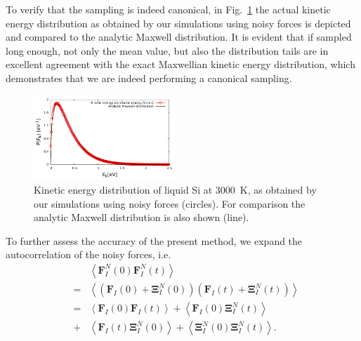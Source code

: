 \documentclass[format=acmsmall,authorversion,nonacm,timestamp,urlbreakonhyphens]{acmart}
\begin{document}
To verify that the sampling is indeed canonical, in Fig.~\ref{Fig3} the actual kinetic energy distribution as obtained by our simulations using noisy forces is depicted and compared to the analytic Maxwell distribution. It is evident that if sampled long enough, not only the mean value, but also the distribution tails are in excellent agreement with the exact Maxwellian kinetic energy distribution, which demonstrates that we are indeed performing a canonical sampling.
\begin{figure}
\begin{center}
\includegraphics[width=0.475\textwidth]
{maxwelldistribution_new.pdf}
\end{center}
\caption{\label{Fig3}
Kinetic energy distribution of liquid Si at 3000~K, as obtained by our simulations using noisy forces (circles). For comparison the analytic Maxwell distribution is also shown (line).
} \end{figure}
To further assess the accuracy of the present method, we expand the autocorrelation of the noisy forces, i.e.
\begin{subequations}
\begin{eqnarray}
  && \left \langle \textbf{F}_{I}^{N}\left ( 0 \right )\textbf{F}_{I}^{N}\left ( t \right )\right \rangle \\
  &=& \left \langle \left ( \textbf{F}_{I}\left ( 0 \right ) + \mathbf{\Xi } _{I}^{N} \left(0 \right )\right) \left( \textbf{F}_{I}\left ( t \right )+\mathbf{\Xi } _{I}^{N}\left ( t \right )\right) \right \rangle \\
  &=& \left \langle \textbf{F}_{I}\left ( 0 \right ) \textbf{F}_{I}\left ( t \right )\right \rangle + \left \langle \textbf{F}_{I}\left ( 0 \right ) \mathbf{\Xi } _{I}^{N}\left(t \right )\right \rangle \label{AutoCorr} \\
  &+& \left \langle \textbf{F}_{I}\left ( t \right ) \mathbf{\Xi } _{I}^{N}\left(0 \right )\right \rangle + \left \langle \mathbf{\Xi } _{I}^{N}\left(0 \right ) \mathbf{\Xi } _{I}^{N}\left(t \right )\right \rangle.  \nonumber
\end{eqnarray}
\end{subequations}
\end{document}
